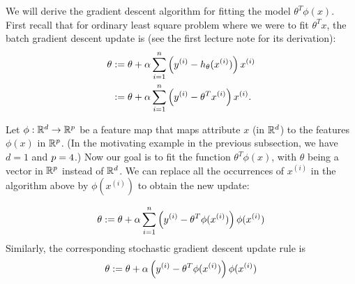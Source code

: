 \documentclass{article}
\begin{document}
We will derive the gradient descent algorithm for fitting the model $\theta^T \phi(x)$. First recall that for ordinary least square problem where we were to fit $\theta^T x$, the batch gradient descent update is  (see the first lecture note for its derivation):
\begin{align}
\theta & := \theta + \alpha \sum_{i=1}^{{n}} \left({y^{(i)}} - h_\theta({x^{(i)}})\right) x^{(i)} \nonumber\\
& := \theta + \alpha \sum_{i=1}^{{n}} \left({y^{(i)}} - \theta^T {x^{(i)}}\right) x^{(i)}. \label{eqn:ordinary}
\end{align}


Let $\phi: \mathbb{R}^{d} \rightarrow \mathbb{R}^{p}$ be a feature map that maps attribute $x$ (in $\mathbb{R}^{d}$) to the features $\phi(x)$ in $\mathbb{R}^{p}$. (In the motivating example in the previous subsection, we have $d=1$ and $p=4$.) Now our goal is to fit the function $\theta^T \phi (x)$, with $\theta$ being a vector in $\mathbb{R}^{p}$ instead of $\mathbb{R}^{d}$. We can replace all the occurrences of $x^{(i)}$ in the algorithm above by $\phi(x^{(i)})$ to obtain the new update: 

\begin{align}
\theta := \theta + \alpha \sum_{i=1}^{{n}} \left({y^{(i)}} - \theta^T \phi({x^{(i)}})\right) \phi(x^{(i)}) \label{eqn:gd-kernel}
\end{align}
Similarly, the corresponding stochastic gradient descent update rule is 
\begin{align}
\theta := \theta + \alpha \left({y^{(i)}} - \theta^T \phi({x^{(i)}})\right) \phi(x^{(i)}) 
\end{align}



\end{document}
